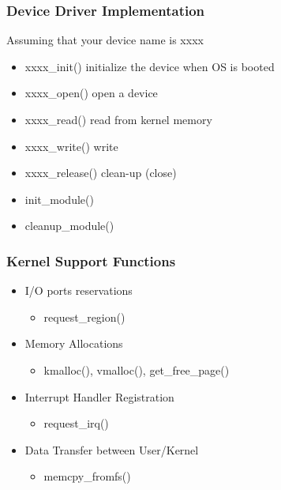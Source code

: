 % 
% 
\begin{frame}[fragile]
    \frametitle{Device Driver Implementation}
Assuming that your device name is xxxx
    \begin{itemize}
        \item xxxx_init() initialize the device when OS is booted
        \item xxxx_open() open a device 
        \item xxxx_read() read from kernel memory 
        \item xxxx_write() write 
        \item xxxx_release() clean-up (close)
        \item init_module()
        \item cleanup_module()
    \end{itemize}
\end{frame}
% 
% 
\begin{frame}[fragile]
    \frametitle{Kernel Support Functions}
    \begin{itemize}
        \item I/O ports reservations
        \begin{itemize}
            \item request_region()
        \end{itemize}
        \item Memory Allocations   
        \begin{itemize}
            \item kmalloc(), vmalloc(), get_free_page()
        \end{itemize}
        \item Interrupt Handler Registration
        \begin{itemize}
            \item request_irq()
        \end{itemize}
        \item Data Transfer between User/Kernel
        \begin{itemize}
            \item memcpy_fromfs()
        \end{itemize}
    \end{itemize}
\end{frame}
% 
% 
